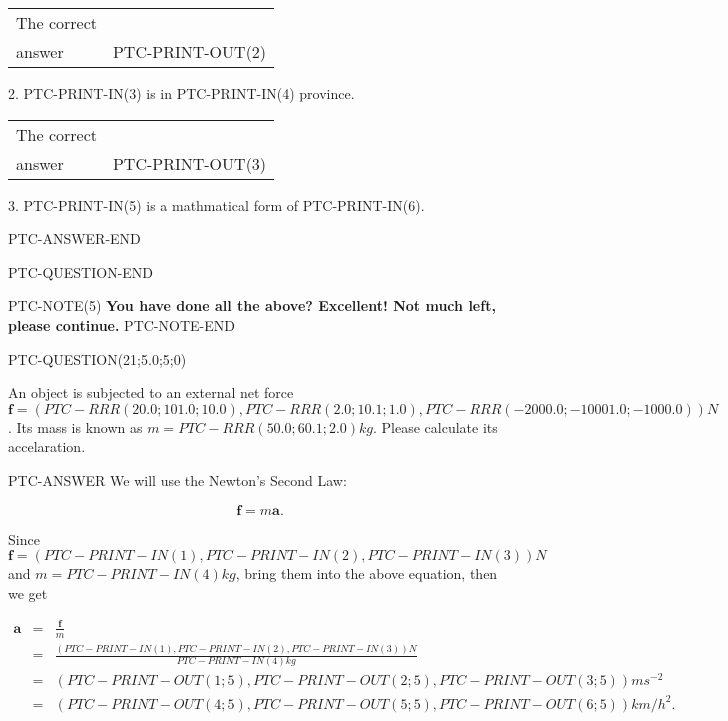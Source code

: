 \documentclass[12pt]{article}
\begin{document}
\noindent\begin{tabular}{|l|l|}\hline The correct & \\
          answer & PTC-PRINT-OUT(2) \\ \hline \end{tabular}
2. PTC-PRINT-IN(3) is in PTC-PRINT-IN(4) province.

\noindent\begin{tabular}{|l|l|}\hline The correct & \\
          answer & PTC-PRINT-OUT(3) \\ \hline \end{tabular}
3. PTC-PRINT-IN(5) is a mathmatical form of PTC-PRINT-IN(6).

PTC-ANSWER-END

\vspace{0.3in}
PTC-QUESTION-END



PTC-NOTE(5)
\vspace{0.3in}
{\textbf{\LARGE{You have done all the above? Excellent! Not much left, please continue.}}}
\vspace{0.3in}
PTC-NOTE-END



\vspace{0.3in}



PTC-QUESTION(21;5.0;5;0)

An object is subjected to an external net force $\mathbf{f}=(
PTC-RRR (20.0; 101.0; 10.0), PTC-RRR( 2.0; 10.1; 1.0),
PTC-RRR (-2000.0; -10001.0; -1000.0)  )N$. Its mass is known as
$m=PTC-RRR ( 50.0; 60.1; 2.0 ) kg$. Please calculate its accelaration.


PTC-ANSWER
We will use the Newton's Second Law:

\[
\mathbf{f}=m\mathbf{a}.
\]

Since $\mathbf{f}=(PTC-PRINT-IN( 1), PTC-PRINT-IN( 2), PTC-PRINT-IN( 3) )N$
and $m=PTC-PRINT-IN( 4) kg$, bring them into the above equation, then we get

\begin{eqnarray*}
\mathbf{a}&=&\frac{\mathbf{f}}m  \\
&=&\frac{(
 PTC-PRINT-IN( 1) ,
 PTC-PRINT-IN( 2 ) ,
 PTC-PRINT-IN( 3 ) )N
}{PTC-PRINT-IN( 4) kg}  \\
&=&(
 PTC-PRINT-OUT (1; 5) ,
 PTC-PRINT-OUT (2 ;5 ),
 PTC-PRINT-OUT (3 ; 5)
)ms^{-2} \\
&=&(
 PTC-PRINT-OUT (4;  5) ,
 PTC-PRINT-OUT( 5 ; 5) ,
 PTC-PRINT-OUT (6;  5 )
)km/h^2.
\end{eqnarray*}
\end{document}
